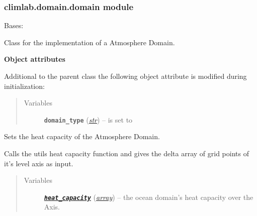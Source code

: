 \documentclass[letterpaper,10pt,english]{sphinxmanual}
\begin{document}
\subsubsection{climlab.domain.domain module}
\label{api/climlab.domain:climlab-domain-domain-module}\label{api/climlab.domain:module-climlab.domain.domain}

\begin{fulllineitems}
\label{api/climlab.domain:climlab.domain.domain.Atmosphere}
Bases: {\hyperref[api/climlab.domain:climlab.domain.domain._Domain]{\emph{}}}

Class for the implementation of a Atmosphere Domain.

\textbf{Object attributes}

Additional to the parent class {\hyperref[api/climlab.domain:climlab.domain.domain._Domain]{\emph{}}}
the following object attribute is modified during initialization:
\begin{quote}\begin{description}
\item[{Variables}] \leavevmode
\textbf{\texttt{domain\_type}} (\href{http://docs.python.org/2.7/library/functions.html\#str}{\emph{str}}) -- is set to 

\end{description}\end{quote}

\begin{fulllineitems}
\label{api/climlab.domain:climlab.domain.domain.Atmosphere.set_heat_capacity}
Sets the heat capacity of the Atmosphere Domain.

Calls the utils heat capacity function 
{\hyperref[api/climlab.utils:climlab.utils.heat_capacity.atmosphere]{\emph{}}} and gives the delta 
array of grid points of it's level axis
 as input.
\begin{quote}\begin{description}
\item[{Variables}] \leavevmode
{\hyperref[api/climlab.utils:module-climlab.utils.heat_capacity]{\emph{\textbf{\texttt{heat\_capacity}}}}} (\href{http://docs.python.org/2.7/library/array.html\#module-array}{\emph{array}}) -- the ocean domain's heat capacity over 
the  Axis.

\end{description}\end{quote}

\end{fulllineitems}


\end{fulllineitems}
\end{document}
